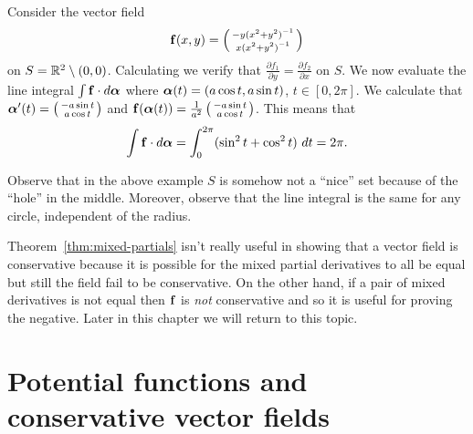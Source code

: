 \begin{example}
    Consider the vector field
    \[
        \mathbf{f}(x,y) = \left(\begin{smallmatrix}
                -y {(x^2 + y^2)}^{-1} \\ x {(x^2 + y^2)}^{-1}
            \end{smallmatrix}\right)
    \]
    on \(S = \mathbb{R}^2 \setminus (0,0)\).
    Calculating we verify that  \(  \tfrac{\partial f_1}{\partial y} = \tfrac{\partial f_2}{\partial x}\) on \(S\).
    We now evaluate the line integral \(\int \mathbf{f} \cdot d\boldsymbol{\alpha}\) where \(\boldsymbol{\alpha}(t) = (a \cos t, a \sin t)\), \(t\in [0,2\pi]\).
    We calculate that
    \(\boldsymbol{\alpha}'(t) = \left(\begin{smallmatrix}
            -a \sin t \\ a \cos t
        \end{smallmatrix}\right)\) and \(\mathbf{f}(\boldsymbol{\alpha}(t)) = \frac{1}{a^2} \left(\begin{smallmatrix}
            -a \sin t \\ a \cos t
        \end{smallmatrix}\right)   \).
    This means that
    \[
        \int \mathbf{f} \cdot d\boldsymbol{\alpha} = \int_{0}^{2\pi} ( \sin^2 t + \cos^2 t )\ dt = 2\pi.
    \]
\end{example}
Observe that in the above example \(S\) is somehow not a ``nice'' set because of the ``hole'' in the middle.
Moreover, observe that the line integral is the same for any circle, independent of the radius.

Theorem~\ref{thm:mixed-partials} isn't really useful in showing that a vector field is conservative because it is possible for the mixed partial derivatives to all be equal but still the field fail to be conservative.
On the other hand, if a pair of mixed derivatives is not equal then \(\mathbf{f}\) is \emph{not} conservative and so it is useful for proving the negative.
Later in this chapter we will return to this topic.

\section{Potential functions and conservative vector fields}

